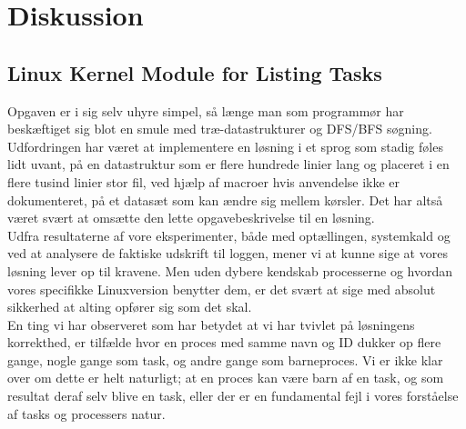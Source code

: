 \documentclass[main.tex]{subfile}
\begin{document}
\section{Diskussion}

\subsection{Linux Kernel Module for Listing Tasks}
Opgaven er i sig selv uhyre simpel, så længe man som programmør har beskæftiget sig blot en smule med træ-datastrukturer og DFS/BFS søgning. Udfordringen har været at implementere en løsning i et sprog som stadig føles lidt uvant, på en datastruktur som er flere hundrede linier lang og placeret i en flere tusind linier stor fil, ved hjælp af macroer hvis anvendelse ikke er dokumenteret, på et datasæt som kan ændre sig mellem kørsler. Det har altså været svært at omsætte den lette opgavebeskrivelse til en løsning.\\

Udfra resultaterne af vore eksperimenter, både med optællingen, systemkald og ved at analysere de faktiske udskrift til loggen, mener vi at kunne sige at vores løsning lever op til kravene. Men uden dybere kendskab processerne og hvordan vores specifikke Linuxversion benytter dem, er det svært at sige med absolut sikkerhed at alting opfører sig som det skal.\\

En ting vi har observeret som har betydet at vi har tvivlet på løsningens korrekthed, er tilfælde hvor en proces med samme navn og ID dukker op flere gange, nogle gange som task, og andre gange som barneproces. Vi er ikke klar over om dette er helt naturligt; at en proces kan være barn af en task, og som resultat deraf selv blive en task, eller der er en fundamental fejl i vores forståelse af tasks og processers natur.
\end{document}
